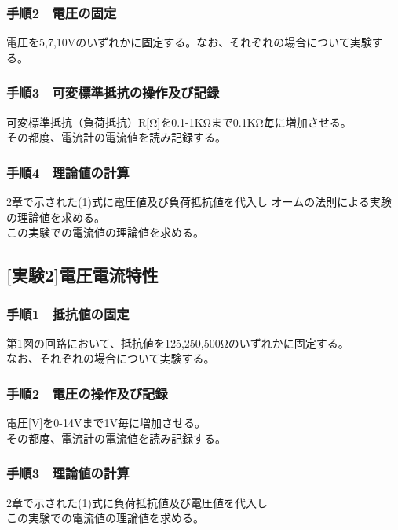 \documentclass[titlepage]{jarticle}
\begin{document}
\subsubsection{手順2　電圧の固定}
電圧を5,7,10Vのいずれかに固定する。なお、それぞれの場合について実験する。
\subsubsection{手順3　可変標準抵抗の操作及び記録}
可変標準抵抗（負荷抵抗）R[Ω]を0.1-1KΩまで0.1KΩ毎に増加させる。\\
その都度、電流計の電流値を読み記録する。
\subsubsection{手順4　理論値の計算}
2章で示された(1)式に電圧値及び負荷抵抗値を代入し
オームの法則による実験の理論値を求める。\\
この実験での電流値の理論値を求める。

\subsection{[実験2]電圧電流特性}
\subsubsection{手順1　抵抗値の固定}
第1図の回路において、抵抗値を125,250,500Ωのいずれかに固定する。\\
なお、それぞれの場合について実験する。
\subsubsection{手順2　電圧の操作及び記録}
電圧[V]を0-14Vまで1V毎に増加させる。\\
その都度、電流計の電流値を読み記録する。
\subsubsection{手順3　理論値の計算}
2章で示された(1)式に負荷抵抗値及び電圧値を代入し\\
この実験での電流値の理論値を求める。
\end{document}
